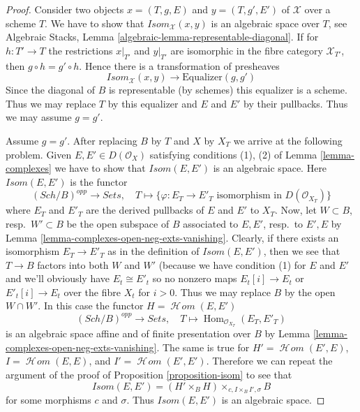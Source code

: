 \documentclass{stacks-project}
\theoremstyle{plain}
\theoremstyle{definition}
\theoremstyle{remark}
\numberwithin{equation}{subsection}
\def\Hom{\mathop{\mathrm{Hom}}\nolimits}
\def\SheafHom{\mathop{\mathcal{H}\!\mathit{om}}\nolimits}
\def\Sch{\mathit{Sch}}
\begin{document}
\begin{proof}
Consider two objects $x = (T, g, E)$ and $y = (T, g', E')$
of $\mathcal{X}$ over a scheme $T$. We have to show that
$\mathit{Isom}_\mathcal{X}(x, y)$ is an algebraic space over $T$, see
Algebraic Stacks, Lemma \ref{algebraic-lemma-representable-diagonal}.
If for $h : T' \to T$ the restrictions $x|_{T'}$ and $y|_{T'}$ are isomorphic
in the fibre category $\mathcal{X}_{T'}$, then $g \circ h = g' \circ h$.
Hence there is a transformation of presheaves
$$
\mathit{Isom}_\mathcal{X}(x, y) \longrightarrow \text{Equalizer}(g, g')
$$
Since the diagonal of $B$ is representable (by schemes) this equalizer is
a scheme. Thus we may replace $T$ by this equalizer and
$E$ and $E'$ by their pullbacks. Thus we may assume $g = g'$.

\medskip\noindent
Assume $g = g'$. After replacing $B$ by $T$ and $X$ by $X_T$ we arrive
at the following problem. Given $E, E' \in D(\mathcal{O}_X)$
satisfying conditions (1), (2) of Lemma \ref{lemma-complexes}
we have to show that $\mathit{Isom}(E, E')$ is an algebraic space.
Here $\mathit{Isom}(E, E')$ is the functor
$$
(\Sch/B)^{opp} \to \textit{Sets},\quad
T \mapsto \{\varphi : E_T \to E'_T
\text{ isomorphism in }D(\mathcal{O}_{X_T})\}
$$
where $E_T$ and $E'_T$ are the derived pullbacks of $E$ and $E'$
to $X_T$. Now, let $W \subset B$, resp.\ $W' \subset B$ be the
open subspace of $B$ associated
to $E, E'$, resp.\ to $E', E$ by
Lemma \ref{lemma-complexes-open-neg-exts-vanishing}.
Clearly, if there exists an isomorphism $E_T \to E'_T$ as in
the definition of $\mathit{Isom}(E, E')$, then we see that
$T \to B$ factors into both $W$ and $W'$ (because we have
condition (1) for $E$ and $E'$ and we'll obviously have
$E_t \cong E'_t$ so no nonzero maps $E_t[i] \to E_t$
or $E'_t[i] \to E_t$ over the fibre $X_t$ for $i > 0$.
Thus we may replace $B$ by the open $W \cap W'$.
In this case the functor $H = \SheafHom(E, E')$
$$
(\Sch/B)^{opp} \to \textit{Sets},\quad T \mapsto
\Hom_{\mathcal{O}_{X_T}}(E_T, E'_T)
$$
is an algebraic space affine and of finite presentation over $B$ by
Lemma \ref{lemma-complexes-open-neg-exts-vanishing}.
The same is true for
$H' = \SheafHom(E', E)$,
$I = \SheafHom(E, E)$, and
$I' = \SheafHom(E', E')$.
Therefore we can repeat the argument of the proof of
Proposition \ref{proposition-isom} to see that
$$
\mathit{Isom}(E, E') = (H' \times_B H) \times_{c, I \times_B I', \sigma} B
$$
for some morphisms $c$ and $\sigma$. Thus
$\mathit{Isom}(E, E')$ is an algebraic space.
\end{proof}
\end{document}
